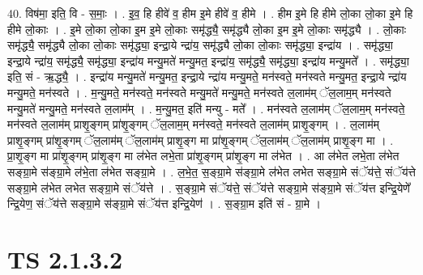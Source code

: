 \documentclass[17pt]{extarticle}
\begin{document}
40. विष॑मा॒ इति॒ वि - स॒माः॒ । . इ॒व॒ हि हीवे॑ व॒ हीम इ॒मे हीवे॑ व॒ हीमे । . हीम इ॒मे हि हीमे लो॒का लो॒का इ॒मे हि हीमे लो॒काः । . इ॒मे लो॒का लो॒का इ॒म इ॒मे लो॒काः समृ॑द्ध्यै॒ समृ॑द्ध्यै लो॒का इ॒म इ॒मे लो॒काः समृ॑द्ध्यै । . लो॒काः समृ॑द्ध्यै॒ समृ॑द्ध्यै लो॒का लो॒काः समृ॑द्ध्या॒ इन्द्रा॒ये न्द्रा॑य॒ समृ॑द्ध्यै लो॒का लो॒काः समृ॑द्ध्या॒ इन्द्रा॑य । . समृ॑द्ध्या॒ इन्द्रा॒ये न्द्रा॑य॒ समृ॑द्ध्यै॒ समृ॑द्ध्या॒ इन्द्रा॑य मन्यु॒मते॑ मन्यु॒मत॒ इन्द्रा॑य॒ समृ॑द्ध्यै॒ समृ॑द्ध्या॒ इन्द्रा॑य मन्यु॒मते᳚ । . समृ॑द्ध्या॒ इति॒ सं - ऋ॒द्ध्यै॒ । . इन्द्रा॑य मन्यु॒मते॑ मन्यु॒मत॒ इन्द्रा॒ये न्द्रा॑य मन्यु॒मते॒ मन॑स्वते॒ मन॑स्वते मन्यु॒मत॒ इन्द्रा॒ये न्द्रा॑य मन्यु॒मते॒ मन॑स्वते । . म॒न्यु॒मते॒ मन॑स्वते॒ मन॑स्वते मन्यु॒मते॑ मन्यु॒मते॒ मन॑स्वते ल॒लाम॑म् ॅल॒लाम॒म् मन॑स्वते मन्यु॒मते॑ मन्यु॒मते॒ मन॑स्वते ल॒लाम᳚म् । . म॒न्यु॒मत॒ इति॑ मन्यु - मते᳚ । . मन॑स्वते ल॒लाम॑म् ॅल॒लाम॒म् मन॑स्वते॒ मन॑स्वते ल॒लाम॑म् प्राशृ॒ङ्गम् प्रा॑शृ॒ङ्गम् ॅल॒लाम॒म् मन॑स्वते॒ मन॑स्वते ल॒लाम॑म् प्राशृ॒ङ्गम् । . ल॒लाम॑म् प्राशृ॒ङ्गम् प्रा॑शृ॒ङ्गम् ॅल॒लाम॑म् ॅल॒लाम॑म् प्राशृ॒ङ्ग मा प्रा॑शृ॒ङ्गम् ॅल॒लाम॑म् ॅल॒लाम॑म् प्राशृ॒ङ्ग मा । . प्रा॒शृ॒ङ्ग मा प्रा॑शृ॒ङ्गम् प्रा॑शृ॒ङ्ग मा ल॑भेत लभे॒ता प्रा॑शृ॒ङ्गम् प्रा॑शृ॒ङ्ग मा ल॑भेत । . आ ल॑भेत लभे॒ता ल॑भेत सङ्ग्रा॒मे स॑ङ्ग्रा॒मे ल॑भे॒ता ल॑भेत सङ्ग्रा॒मे । . ल॒भे॒त॒ स॒ङ्ग्रा॒मे स॑ङ्ग्रा॒मे ल॑भेत लभेत सङ्ग्रा॒मे संॅय॑त्ते॒ संॅय॑त्ते सङ्ग्रा॒मे ल॑भेत लभेत सङ्ग्रा॒मे संॅय॑त्ते । . स॒ङ्ग्रा॒मे संॅय॑त्ते॒ संॅय॑त्ते सङ्ग्रा॒मे स॑ङ्ग्रा॒मे संॅय॑त्त इन्द्रि॒येणे᳚ न्द्रि॒येण॒ संॅय॑त्ते सङ्ग्रा॒मे स॑ङ्ग्रा॒मे संॅय॑त्त इन्द्रि॒येण॑ । . स॒ङ्ग्रा॒म इति॑ सं - ग्रा॒मे । \newline
\pagebreak
{}

\section{ TS 2.1.3.2 }
\end{document}
